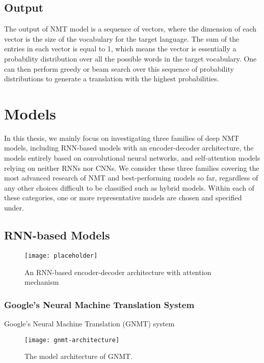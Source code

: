 \subsection{Output}

The output of NMT model is a sequence of vectors, where the dimension of each vector is the size of the vocabulary for the target language. The sum of the entries in each vector is equal to 1, which means the vector is essentially a probability distribution over all the possible words in the target vocabulary. One can then perform greedy or beam search over this sequence of probability distributions to generate a translation with the highest probabilities.


\section{Models}

In this thesis, we mainly focus on investigating three families of deep NMT models, including RNN-based models with an encoder-decoder architecture, the models entirely based on convolutional neural networks, and self-attention models relying on neither RNNs nor CNNs. We consider these three families covering the most advanced research of NMT and best-performing models so far, regardless of any other choices difficult to be classified such as hybrid models. Within each of these categories, one or more representative models are chosen and specified under.

\subsection{RNN-based Models}



\begin{figure}[h]
\texttt{[image: placeholder]}
\centering
\caption{An RNN-based encoder-decoder architecture with attention mechanism}
\label{figure:rnn encoder-decoder}
\end{figure}

\subsubsection*{Google's Neural Machine Translation System}

Google's Neural Machine Translation (GNMT) system \cite{Wu2016} 

\begin{figure}[h]
\texttt{[image: gnmt-architecture]}
\centering
\caption{The model architecture of GNMT.}
\label{figure:gnmt architecture}
\end{figure}

